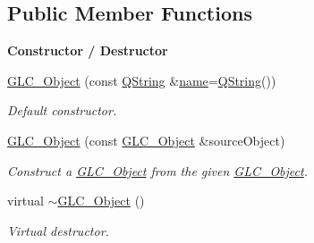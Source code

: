 \subsection*{Public Member Functions}
\begin{Indent}{\bf Constructor / Destructor}\par
\begin{DoxyCompactItemize}
\item 
\hyperlink{class_g_l_c___object_a4eef65edf485d22504c2ef661da0f759}{G\-L\-C\-\_\-\-Object} (const \hyperlink{group___u_a_v_objects_plugin_gab9d252f49c333c94a72f97ce3105a32d}{Q\-String} \&\hyperlink{glext_8h_ad977737dfc9a274a62741b9500c49a32}{name}=\hyperlink{group___u_a_v_objects_plugin_gab9d252f49c333c94a72f97ce3105a32d}{Q\-String}())
\begin{DoxyCompactList}\small\item\em Default constructor. \end{DoxyCompactList}\item 
\hyperlink{class_g_l_c___object_a1abaeb27274868c0776b8a6cec2abc1c}{G\-L\-C\-\_\-\-Object} (const \hyperlink{class_g_l_c___object}{G\-L\-C\-\_\-\-Object} \&source\-Object)
\begin{DoxyCompactList}\small\item\em Construct a \hyperlink{class_g_l_c___object}{G\-L\-C\-\_\-\-Object} from the given \hyperlink{class_g_l_c___object}{G\-L\-C\-\_\-\-Object}. \end{DoxyCompactList}\item 
virtual \hyperlink{class_g_l_c___object_ab1a881fe7e67db986ec2d6330c62f654}{$\sim$\-G\-L\-C\-\_\-\-Object} ()
\begin{DoxyCompactList}\small\item\em Virtual destructor. \end{DoxyCompactList}\end{DoxyCompactItemize}
\end{Indent}
